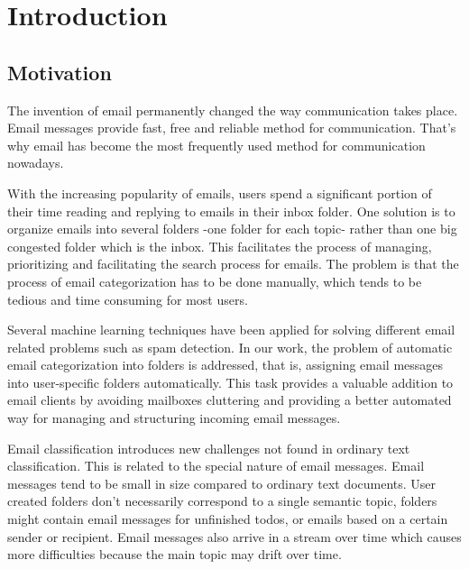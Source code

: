 
\chapter{Introduction} %

\label{Chapter1} %


\section{Motivation}

The invention of email permanently changed the way communication takes place. 
Email messages provide fast, free and reliable method for communication. 
That's why email has become the most frequently used method for communication 
nowadays.

With the increasing popularity of emails, users spend a significant portion of 
their time reading and replying to emails in their inbox folder. One solution 
is to organize emails into several folders -one folder for each topic- rather 
than one big congested folder which is the inbox. This facilitates the process 
of managing, prioritizing and facilitating the search process for emails. 
The problem is that the process of email categorization has to be done manually, 
which tends to be tedious and time consuming for most users.

Several machine learning techniques have been applied for solving different 
email related problems such as spam detection. In our work, the problem of 
automatic email categorization into folders is addressed, that is, assigning 
email messages into user-specific folders automatically. This task provides 
a valuable addition to email clients by avoiding mailboxes cluttering and 
providing a better automated way for managing and structuring incoming email 
messages.

Email classification introduces new challenges not found in ordinary text 
classification. This is related to the special nature of email messages. Email 
messages tend to be small in size compared to ordinary text documents. User 
created folders don't necessarily correspond to a single semantic topic, 
folders might contain email messages for unfinished todos, or emails based on 
a certain sender or recipient. Email messages also arrive in a stream over time 
which causes more difficulties because the main topic may drift over time.

